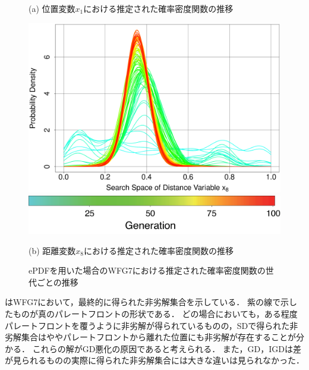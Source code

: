 \documentclass[../main/main]{subfiles}
\begin{document}
\begin{figure}[!h]
\begin{minipage}{0.61\hsize}
\begin{minipage}{0.49\hsize}
\begin{center}
{\footnotesize (a) 位置変数$x_1$における推定された確率密度関数の推移}
\end{center}
\end{minipage}
\begin{minipage}{0.49\hsize}
\includegraphics[width=1\linewidth]{../figures/WFG7_var8_pdf_trend.eps}\\
\centering
\hspace{0.2in} \includegraphics[width=0.8\linewidth]{../figures/color_bar_100ver.eps}
\begin{center}
{\footnotesize (b) 距離変数$x_{8}$における推定された確率密度関数の推移}
\end{center}
\end{minipage}
\caption{ePDFを用いた場合のWFG7における推定された確率密度関数の世代ごとの推移}
\label{pdf_trans_wfg7}
\end{minipage}
\label{fig:nondom_sol}
\end{figure}

\afterpage{\clearpage}


はWFG7において，最終的に得られた非劣解集合を示している．
紫の線で示したものが真のパレートフロントの形状である．
どの場合においても，ある程度パレートフロントを覆うように非劣解が得られているものの，SDで得られた非劣解集合はややパレートフロントから離れた位置にも非劣解が存在することが分かる．
これらの解がGD悪化の原因であると考えられる．
また，GD，IGDは差が見られるものの実際に得られた非劣解集合には大きな違いは見られなかった．
\end{document}

